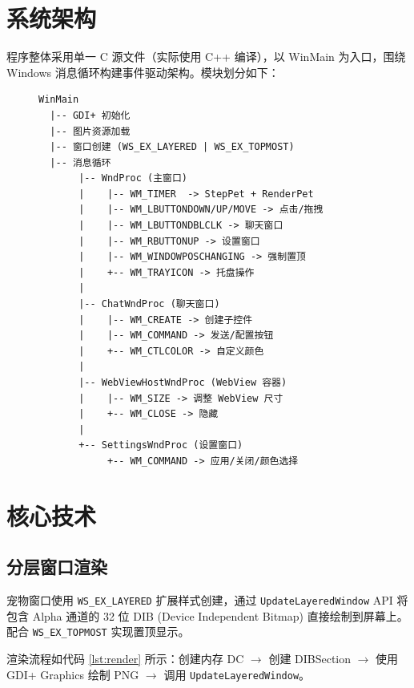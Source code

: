 \documentclass[12pt,a4paper]{ctexart}
\begin{document}
\section{系统架构}

程序整体采用单一 C 源文件（实际使用 C++ 编译），以 WinMain 为入口，围绕 Windows 消息循环构建事件驱动架构。模块划分如下：

\begin{figure}[H]
\centering
\begin{minipage}{0.9\textwidth}
\begin{lstlisting}[frame=single,numbers=none]
WinMain
  |-- GDI+ 初始化
  |-- 图片资源加载
  |-- 窗口创建 (WS_EX_LAYERED | WS_EX_TOPMOST)
  |-- 消息循环
       |-- WndProc (主窗口)
       |    |-- WM_TIMER  -> StepPet + RenderPet
       |    |-- WM_LBUTTONDOWN/UP/MOVE -> 点击/拖拽
       |    |-- WM_LBUTTONDBLCLK -> 聊天窗口
       |    |-- WM_RBUTTONUP -> 设置窗口
       |    |-- WM_WINDOWPOSCHANGING -> 强制置顶
       |    +-- WM_TRAYICON -> 托盘操作
       |
       |-- ChatWndProc (聊天窗口)
       |    |-- WM_CREATE -> 创建子控件
       |    |-- WM_COMMAND -> 发送/配置按钮
       |    +-- WM_CTLCOLOR -> 自定义颜色
       |
       |-- WebViewHostWndProc (WebView 容器)
       |    |-- WM_SIZE -> 调整 WebView 尺寸
       |    +-- WM_CLOSE -> 隐藏
       |
       +-- SettingsWndProc (设置窗口)
            +-- WM_COMMAND -> 应用/关闭/颜色选择
\end{lstlisting}
\end{minipage}
\end{figure}

\section{核心技术}

\subsection{分层窗口渲染}

宠物窗口使用 \texttt{WS\_EX\_LAYERED} 扩展样式创建，通过 \texttt{UpdateLayeredWindow} API
将包含 Alpha 通道的 32 位 DIB (Device Independent Bitmap) 直接绘制到屏幕上。
配合 \texttt{WS\_EX\_TOPMOST} 实现置顶显示。

渲染流程如代码 \ref{lst:render} 所示：创建内存 DC $\to$ 创建 DIBSection $\to$
使用 GDI+ Graphics 绘制 PNG $\to$ 调用 \texttt{UpdateLayeredWindow}。
\end{document}
